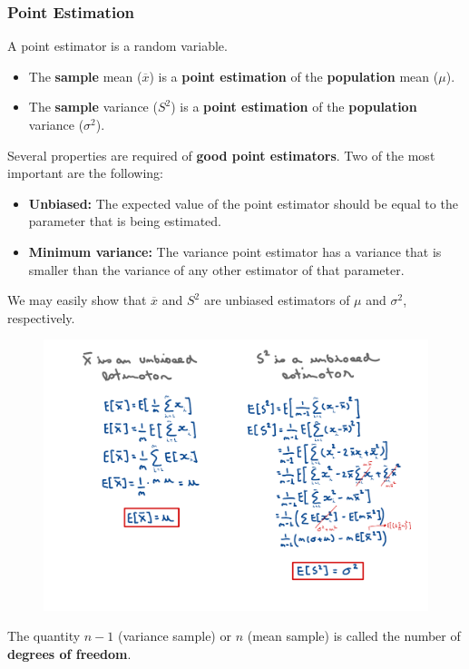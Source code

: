 \begin{frame}
    \frametitle{Point Estimation}

    A point estimator is a random variable.
    \begin{itemize}
        \item The \textbf{sample} mean ($\overline{x}$) is a \textbf{point estimation} of the
        \textbf{population} mean ($\mu$). 

        \item The \textbf{sample} variance ($S^2$) is a \textbf{point estimation} of the
        \textbf{population} variance ($\sigma^2$).
    \end{itemize}

    Several properties are required of \textbf{good point estimators}. 
    Two of the most important are the following:

    \begin{itemize}
        \item \textbf{Unbiased:} The expected value of the point estimator should be equal to the 
        parameter that is being estimated.
        \item \textbf{Minimum variance:} The variance point estimator has a variance that is smaller 
        than the variance of any other estimator of that parameter.
    \end{itemize}

\end{frame}

\begin{frame}

    We may easily show that $\overline{x}$ and $S^2$ are unbiased estimators of $\mu$ and $\sigma^2$, respectively.
    \begin{figure}
        \centering
        \includegraphics[width=1\textwidth]{slides/figures/mean_and_variance_unbiased_proof.pdf}
    \end{figure}

    The quantity $n-1$ (variance sample) or $n$ (mean sample) is called the number of \textbf{degrees of freedom}.

\end{frame}






